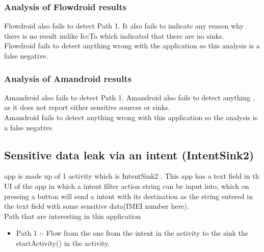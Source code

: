 \documentclass[journal]{IEEEtran}
\begin{document}
\subsubsection{Analysis of Flowdroid results}
Flowdroid also fails to detect Path 1. It also fails to indicate any reason why there is no result unlike IccTa which indicated that there are no sinks. \\
Flowdroid fails to detect anything wrong with the application so this analysis is a false negative.\\

\subsubsection{Analysis of Amandroid results}
Amandroid also fails to detect Path 1. Amandroid also fails to detect anything , as it does not report either sensitive sources or sinks.\\
Amandroid fails to detect anything wrong with this application so the analysis is a false negative.\\


\subsection{Sensitive data leak via an intent (IntentSink2)}
% 
% 
% 
% 
 app is made up of 1 activity which is IntentSink2 . This app has a text field in th UI of the app in which a intent filter action string can be input into, which on pressing a button will send a intent with its destination as the string entered in the text field with some sensitive data(IMEI number here).\\

Path that are interesting in this application
\begin{itemize}
	\item Path 1 :-  Flow from the one from the intent in the activity to the sink the startActivity()  in the activity.
\end{itemize}
\end{document}
